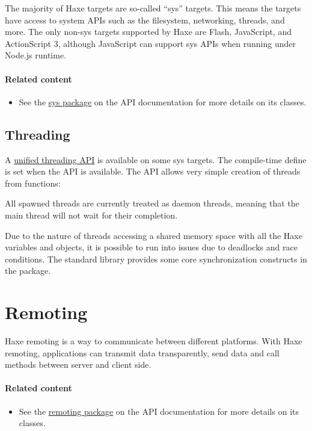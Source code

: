 The majority of Haxe targets are so-called ``sys'' targets. This means the targets have access to system APIs such as the filesystem, networking, threads, and more. The only non-sys targets supported by Haxe are Flash, JavaScript, and ActionScript 3, although JavaScript can support sys APIs when running under Node.js runtime.

\paragraph{Related content}
\begin{itemize}
	\item See the \href{https://api.haxe.org/sys/}{sys package} on the API documentation for more details on its classes.
\end{itemize}

\subsection{Threading}


A \href{https://api.haxe.org/sys/thread/Thread.html}{unified threading API} is available on some sys targets. The compile-time define  is set when the API is available. The API allows very simple creation of threads from functions:


All spawned threads are currently treated as daemon threads, meaning that the main thread will not wait for their completion.

Due to the nature of threads accessing a shared memory space with all the Haxe variables and objects, it is possible to run into issues due to deadlocks and race conditions. The standard library provides some core synchronization constructs in the \href{https://api.haxe.org/sys/thread/}{} package.


\section{Remoting}
\label{std-remoting}

Haxe remoting is a way to communicate between different platforms. With Haxe remoting, applications can transmit data transparently, send data and call methods between server and client side.

\paragraph{Related content}
\begin{itemize}
	\item See the \href{https://api.haxe.org/haxe/remoting/}{remoting package} on the API documentation for more details on its classes.
\end{itemize}

